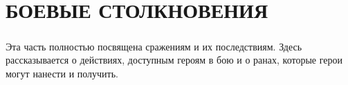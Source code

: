 \chapter{БОЕВЫЕ СТОЛКНОВЕНИЯ}
\paragraph{}
Эта часть полностью посвящена сражениям и их последствиям.
Здесь рассказывается о действиях, доступным героям в бою
и о ранах, которые герои могут нанести и получить.





